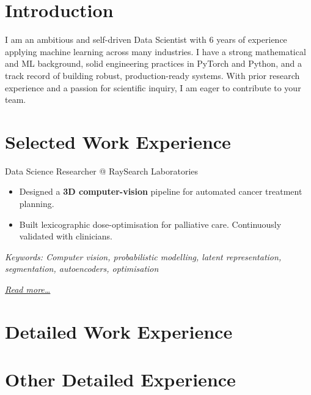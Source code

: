 \documentclass[11pt,a4paper]{moderncv}
\begin{document}
\makecvtitle

\section*{Introduction}
I am an ambitious and self-driven Data Scientist with 6 years of experience applying machine learning across many industries. I have a strong mathematical and ML background, solid engineering practices in PyTorch and Python, and a track record of building robust, production-ready systems. With prior research experience and a passion for scientific inquiry, I am eager to contribute to your team.



\section{Selected Work Experience}
\large{Data Science Researcher @ RaySearch Laboratories}

\normalsize
\begin{itemize}
    \item Designed a \textbf{3D computer-vision} pipeline for automated cancer treatment planning.
    \item Built lexicographic dose-optimisation for palliative care. Continuously validated with clinicians.
\end{itemize}

{\footnotesize\textit{Keywords: Computer vision, probabilistic modelling, latent representation, segmentation, autoencoders, optimisation}}

\hfill{\small{\textit{\hyperref[sec:raysearch]{Read more…}}}}







\newpage
\section{Detailed Work Experience}





\section{Other Detailed Experience}

\end{document}
